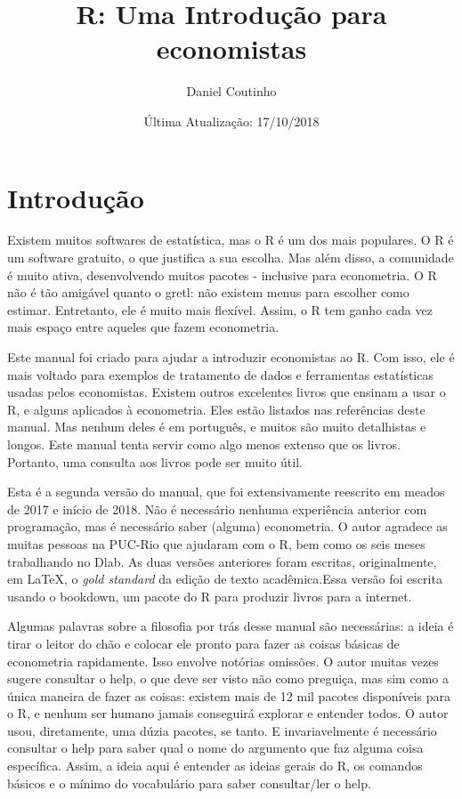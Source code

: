 \documentclass[]{book}
\title{R: Uma Introdução para economistas}
\author{Daniel Coutinho}
\date{Última Atualização: 17/10/2018}
\begin{document}
\maketitle

{
\setcounter{tocdepth}{1}
\tableofcontents
}
\chapter{Introdução}\label{introducao}

Existem muitos softwares de estatística, mas o R é um dos mais
populares. O R é um software gratuito, o que justifica a sua escolha.
Mas além disso, a comunidade é muito ativa, desenvolvendo muitos pacotes
- inclusive para econometria. O R não é tão amigável quanto o gretl: não
existem menus para escolher como estimar. Entretanto, ele é muito mais
flexível. Assim, o R tem ganho cada vez mais espaço entre aqueles que
fazem econometria.

Este manual foi criado para ajudar a introduzir economistas ao R. Com
isso, ele é mais voltado para exemplos de tratamento de dados e
ferramentas estatísticas usadas pelos economistas. Existem outros
excelentes livros que ensinam a usar o R, e alguns aplicados à
econometria. Eles estão listados nas referências deste manual. Mas
nenhum deles é em português, e muitos são muito detalhistas e longos.
Este manual tenta servir como algo menos extenso que os livros.
Portanto, uma consulta aos livros pode ser muito útil.

Esta é a segunda versão do manual, que foi extensivamente reescrito em
meados de 2017 e início de 2018. Não é necessário nenhuma experiência
anterior com programação, mas é necessário saber (alguma) econometria. O
autor agradece as muitas pessoas na PUC-Rio que ajudaram com o R, bem
como os seis meses trabalhando no Dlab. As duas versões anteriores foram
escritas, originalmente, em LaTeX, o \emph{gold standard} da edição de
texto acadêmica.Essa versão foi escrita usando o bookdown, um pacote do
R para produzir livros para a internet.

Algumas palavras sobre a filosofia por trás desse manual são
necessárias: a ideia é tirar o leitor do chão e colocar ele pronto para
fazer as coisas básicas de econometria rapidamente. Isso envolve
notórias omissões. O autor muitas vezes sugere consultar o help, o que
deve ser visto não como preguiça, mas sim como a única maneira de fazer
as coisas: existem mais de 12 mil pacotes disponíveis para o R, e nenhum
ser humano jamais conseguirá explorar e entender todos. O autor usou,
diretamente, uma dúzia pacotes, se tanto. E invariavelmente é necessário
consultar o help para saber qual o nome do argumento que faz alguma
coisa específica. Assim, a ideia aqui é entender as ideias gerais do R,
os comandos básicos e o mínimo do vocabulário para saber consultar/ler o
help.
\end{document}

